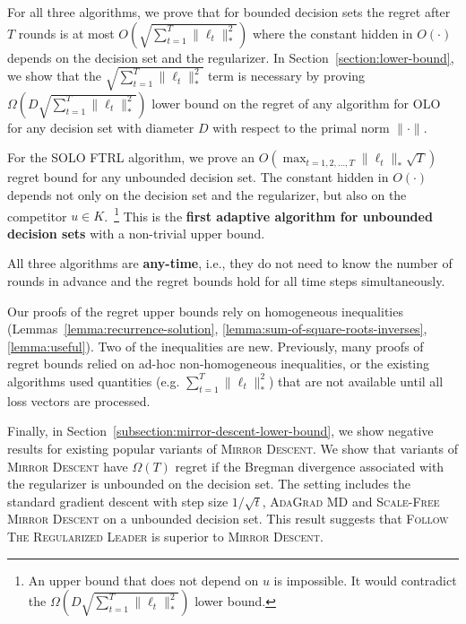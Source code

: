 For all three algorithms, we prove that for bounded decision sets the regret
after $T$ rounds is at most $O \left(\sqrt{\sum_{t=1}^T\|\ell_t\|_*^2} \right)$
where the constant hidden in $O(\cdot)$ depends on the decision set and the
regularizer.  In Section~\ref{section:lower-bound}, we show that the
$\sqrt{\sum_{t=1}^T \|\ell_t\|_*^2}$ term is necessary by proving $\Omega
\left(D \sqrt{\sum_{t=1}^T\|\ell_t\|_*^2} \right)$ lower bound on the regret of
any algorithm for OLO for any decision set with diameter $D$ with respect to
the primal norm $\|\cdot\|$.

For the \textsc{SOLO FTRL} algorithm, we prove an $O \left(\max_{t=1,2,\dots,T}
\|\ell_t\|_* \sqrt{T} \right)$ regret bound for any unbounded decision set. The
constant hidden in $O(\cdot)$ depends not only on the decision set and the
regularizer, but also on the competitor $u \in K$.~\footnote{An upper bound
that does not depend on $u$ is impossible. It would contradict the $\Omega
\left( D \sqrt{\sum_{t=1}^T\|\ell_t\|_*^2} \right)$ lower bound.} This is the
\textbf{first adaptive algorithm for unbounded decision sets} with a
non-trivial upper bound.

All three algorithms are \textbf{any-time}, i.e., they do not need to know the
number of rounds in advance and the regret bounds hold for all time steps
simultaneously.

Our proofs of the regret upper bounds rely on homogeneous inequalities
(Lemmas~\ref{lemma:recurrence-solution},
\ref{lemma:sum-of-square-roots-inverses}, \ref{lemma:useful}).  Two of the
inequalities are new. Previously, many proofs of regret bounds relied on ad-hoc
non-homogeneous inequalities, or the existing algorithms used quantities (e.g.
$\sum_{t=1}^T \|\ell_t\|_*^2$) that are not available until all loss vectors
are processed.

Finally, in Section~\ref{subsection:mirror-descent-lower-bound}, we show
negative results for existing popular variants of \textsc{Mirror Descent}. We
show that variants of \textsc{Mirror Descent} have $\Omega(T)$ regret if the
Bregman divergence associated with the regularizer is unbounded on the decision
set.  The setting includes the standard gradient descent with step size
$1/\sqrt{t}$, \textsc{AdaGrad MD} and \textsc{Scale-Free Mirror Descent} on a
unbounded decision set. This result suggests that \textsc{Follow The
Regularized Leader} is superior to \textsc{Mirror Descent}.
